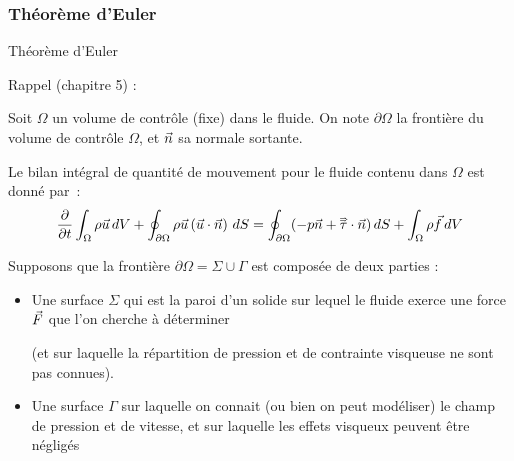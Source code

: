 \subsubsection{Théorème d'Euler}
\begin{frame}{Théorème d'Euler}

\small

Rappel  (chapitre 5) :

Soit $\Omega$ un volume de contrôle (fixe) dans le fluide. On note $\partial \Omega$ la frontière du volume de contrôle $\Omega$, et $\vec{n}$ sa normale sortante.


\pause \medskip

Le bilan intégral de quantité de mouvement pour le fluide contenu dans $\Omega$ est donné par~:
\begin{equation}
   \displaystyle \frac{\partial }{\partial t} \int_\Omega \rho \vec{u} \, dV  
   + \oint_{\partial \Omega} \rho \vec{u} \left ( \vec{u} \cdot \vec{n} \right ) \, dS
   =
    \oint_{\partial \Omega}  ( - p \vec{n} + \accentset{\Rightarrow}{\tau} \cdot \vec{n}) \, dS
   + \int_\Omega \rho \vec{f} \, dV
\end{equation}





\pause
\smallskip

Supposons que la frontière $\partial \Omega = \Sigma \cup \Gamma$ est composée de deux parties :

\begin{itemize}
\item Une surface $\Sigma$ qui est la paroi d'un solide sur lequel le fluide exerce une force 
$\vec{F}$ que l'on cherche à déterminer 

(et sur laquelle la répartition de pression et de contrainte visqueuse ne sont pas connues).

\item Une surface $\Gamma$ sur laquelle on connait (ou bien on peut modéliser) le champ de pression et de vitesse, et sur laquelle les effets visqueux peuvent être négligés
\end{itemize}


\end{frame}
